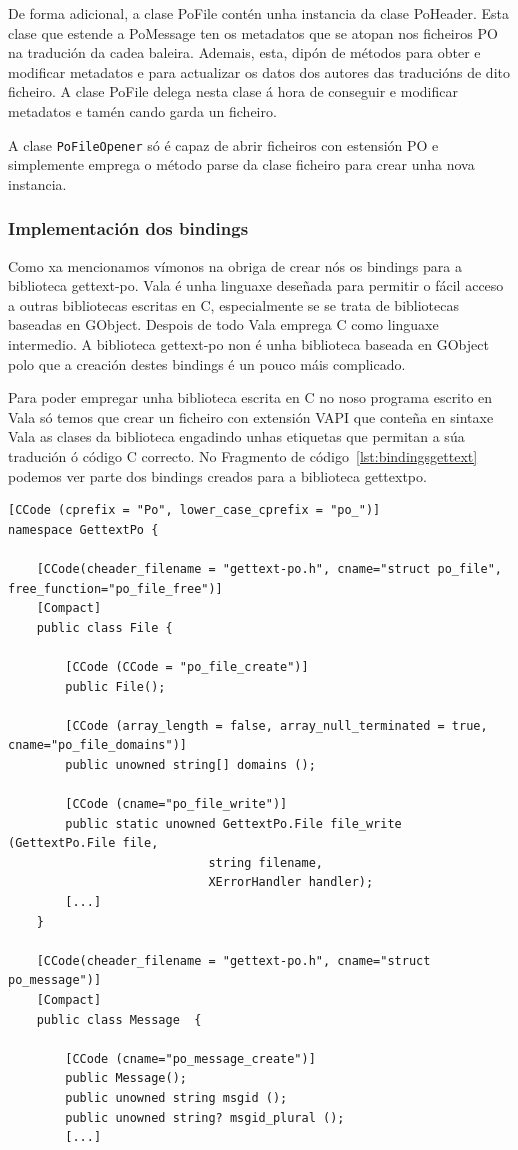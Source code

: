De forma adicional, a clase PoFile contén unha instancia da clase PoHeader. Esta clase que estende a PoMessage ten os metadatos que se atopan nos ficheiros PO na tradución da cadea baleira. Ademais, esta, dipón de métodos para obter e modificar metadatos e para actualizar os datos dos autores das traducións de dito ficheiro. A clase PoFile delega nesta clase á hora de conseguir e modificar metadatos e tamén cando garda un ficheiro.

A clase \lstinline{PoFileOpener} só é capaz de abrir ficheiros con estensión PO e simplemente emprega o método parse da clase ficheiro para crear unha nova instancia.

\subsubsection{Implementación dos bindings}
Como xa mencionamos vímonos na obriga de crear nós os bindings para a biblioteca gettext-po. Vala é unha linguaxe deseñada para permitir o fácil acceso a outras bibliotecas escritas en C, especialmente se se trata de bibliotecas baseadas en GObject. Despois de todo Vala emprega C como linguaxe intermedio. A biblioteca gettext-po non é unha biblioteca baseada en GObject polo que a creación destes bindings é un pouco máis complicado.

Para poder empregar unha biblioteca escrita en C no noso programa escrito en Vala só temos que crear un ficheiro con extensión VAPI que conteña en sintaxe Vala as clases da biblioteca engadindo unhas etiquetas que permitan a súa tradución ó código C correcto. No Fragmento de código~\ref{lst:bindingsgettext} podemos ver parte dos bindings creados para a biblioteca gettextpo.

\lstset{language=[sharp]C}
\begin{lstlisting}[label=lst:bindingsgettext,caption=Bindings da biblioteca GettextPo]
[CCode (cprefix = "Po", lower_case_cprefix = "po_")]
namespace GettextPo {

    [CCode(cheader_filename = "gettext-po.h", cname="struct po_file", free_function="po_file_free")]
    [Compact]
    public class File {

        [CCode (CCode = "po_file_create")]
        public File();

        [CCode (array_length = false, array_null_terminated = true, cname="po_file_domains")]
        public unowned string[] domains ();

        [CCode (cname="po_file_write")]
        public static unowned GettextPo.File file_write (GettextPo.File file,
                            string filename,
                            XErrorHandler handler);
        [...]
    }

    [CCode(cheader_filename = "gettext-po.h", cname="struct po_message")]
    [Compact]
    public class Message  {

        [CCode (cname="po_message_create")]
        public Message();
        public unowned string msgid ();
        public unowned string? msgid_plural ();
        [...]
\end{lstlisting}

